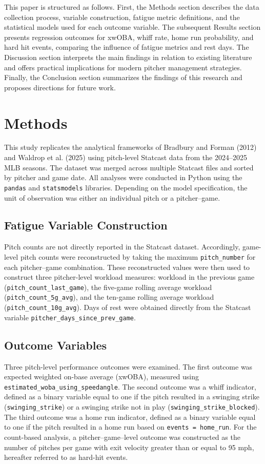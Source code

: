 \documentclass[12pt, letterpaper]{article}
\begin{document}
This paper is structured as follows. First, the Methods section describes the data collection process, variable construction, fatigue metric definitions, and the statistical models used for each outcome variable. The subsequent Results section presents regression outcomes for xwOBA, whiff rate, home run probability, and hard hit events, comparing the influence of fatigue metrics and rest days. The Discussion section interprets the main findings in relation to existing literature and offers practical implications for modern pitcher management strategies. Finally, the Conclusion section summarizes the findings of this research and proposes directions for future work.

\section{Methods}

This study replicates the analytical frameworks of Bradbury and Forman (2012) and Waldrop et al. (2025) using pitch-level Statcast data from the 2024--2025 MLB seasons. The dataset was merged across multiple Statcast files and sorted by pitcher and game date. All analyses were conducted in Python using the \texttt{pandas} and \texttt{statsmodels} libraries. Depending on the model specification, the unit of observation was either an individual pitch or a pitcher--game.

\subsection{Fatigue Variable Construction}

Pitch counts are not directly reported in the Statcast dataset. Accordingly, game-level pitch counts were reconstructed by taking the maximum \texttt{pitch\_number} for each pitcher--game combination. These reconstructed values were then used to construct three pitcher-level workload measures: workload in the previous game (\texttt{pitch\_count\_last\_game}), the five-game rolling average workload (\texttt{pitch\_count\_5g\_avg}), and the ten-game rolling average workload (\texttt{pitch\_count\_10g\_avg}). Days of rest were obtained directly from the Statcast variable \texttt{pitcher\_days\_since\_prev\_game}.

\subsection{Outcome Variables}

Three pitch-level performance outcomes were examined. The first outcome was expected weighted on-base average (xwOBA), measured using \texttt{estimated\_woba\_using\_speedangle}. The second outcome was a whiff indicator, defined as a binary variable equal to one if the pitch resulted in a swinging strike (\texttt{swinging\_strike}) or a swinging strike not in play (\texttt{swinging\_strike\_blocked}). The third outcome was a home run indicator, defined as a binary variable equal to one if the pitch resulted in a home run based on \texttt{events = home\_run}. For the count-based analysis, a pitcher--game–level outcome was constructed as the number of pitches per game with exit velocity greater than or equal to 95 mph, hereafter referred to as hard-hit events.
\end{document}
